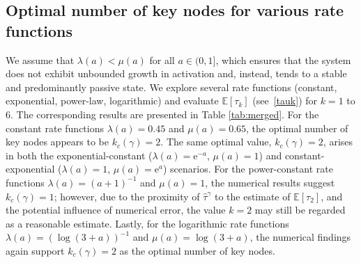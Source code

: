 \documentclass[11pt]{article}
\numberwithin{equation}{section}
\begin{document}

\subsection{Optimal number of key nodes for various rate functions}
\label{ss.optch}

We assume that $\lambda(a) < \mu(a)$ for all $a\in (0,1]$, which ensures that the system does not exhibit unbounded growth in activation and, instead, tends to a stable and predominantly passive state.
We explore several rate functions (constant, exponential, power-law, logarithmic) and evaluate $\mathbb{E}[\tau_k]$ (see~\eqref{tauk}) for $k=1$ to $6$. The corresponding results are presented in Table \ref{tab:merged}. For the constant rate functions $\lambda(a) = 0.45$ and $\mu(a) = 0.65$, the optimal number of key nodes appears to be $k_c(\gamma) = 2$. The same optimal value, $k_c(\gamma) = 2$, arises in both the exponential-constant ($\lambda(a) = \mathrm{e}^{-a}$, $\mu(a) = 1$) and constant-exponential ($\lambda(a) = 1$, $\mu(a) = \mathrm{e}^a$) scenarios. For the power-constant rate functions $\lambda(a) = (a+1)^{-1}$ and $\mu(a) = 1$, the numerical results suggest $k_c(\gamma) = 1$; however, due to the proximity of $\hat{\tau}^{\gamma}$ to the estimate of $\mathbb{E}[\tau_2]$, and the potential influence of numerical error, the value $k = 2$ may still be regarded as a reasonable estimate. Lastly, for the logarithmic rate functions $\lambda(a) = (\log(3+a))^{-1}$ and $\mu(a) = \log(3+a)$, the numerical findings again support $k_c(\gamma) = 2$ as the optimal number of key nodes.
\end{document}
